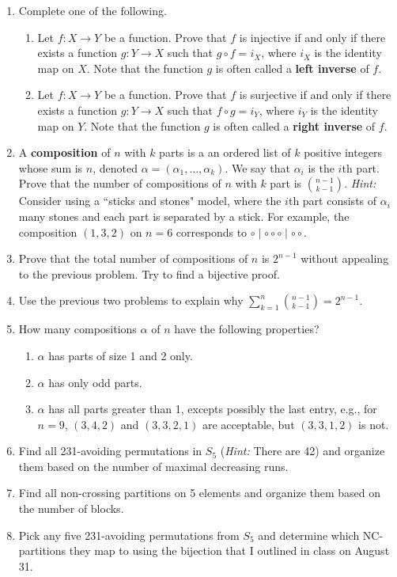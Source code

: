 \documentclass[11pt]{article}%
\theoremstyle{definition}
\begin{document}
\begin{enumerate}

\item Complete one of the following.
\begin{enumerate}
\item Let $f:X\to Y$ be a function.  Prove that $f$ is injective if and only if there exists a function $g:Y\to X$ such that $g\circ f=i_X$, where $i_X$ is the identity map on $X$. Note that the function $g$ is often called a \textbf{left inverse} of $f$.
\item Let $f:X\to Y$ be a function.  Prove that $f$ is surjective if and only if there exists a function $g:Y\to X$ such that $f\circ g=i_Y$, where $i_Y$ is the identity map on $Y$. Note that the function $g$ is often called a \textbf{right inverse} of $f$.
\end{enumerate}
\item A \textbf{composition} of $n$ with $k$ parts is a an ordered list of $k$ positive integers whose sum is $n$, denoted $\alpha=(\alpha_1,\ldots,\alpha_k)$.  We say that $\alpha_i$ is the $i$th part.  Prove that the number of compositions of $n$ with $k$ part is $\binom{n-1}{k-1}$.  \emph{Hint:} Consider using a ``sticks and stones" model, where the $i$th part consists of $\alpha_i$ many stones and each part is separated by a stick. For example, the composition $(1,3,2)$ on $n=6$ corresponds to $\circ \mid \circ \circ \circ \mid \circ \circ$.
\item Prove that the total number of compositions of $n$ is $2^{n-1}$ without appealing to the previous problem. Try to find a bijective proof.
\item Use the previous two problems to explain why $\sum_{k=1}^n\binom{n-1}{k-1}=2^{n-1}$.
\item\label{nugget} How many compositions $\alpha$ of $n$ have the following properties?
\begin{enumerate}
\item $\alpha$ has parts of size 1 and 2 only.
\item $\alpha$ has only odd parts.
\item $\alpha$ has all parts greater than 1, excepts possibly the last entry, e.g., for $n=9$, $(3,4,2)$ and $(3,3,2,1)$ are acceptable, but $(3,3,1,2)$ is not.
\end{enumerate}
\item Find all 231-avoiding permutations in $S_5$ (\emph{Hint:} There are 42) and organize them based on the number of maximal decreasing runs.
\item Find all non-crossing partitions on 5 elements and organize them based on the number of blocks.
\item Pick any five 231-avoiding permutations from $S_5$ and determine which NC-partitions they map to using the bijection that I outlined in class on August 31.
\end{enumerate}
\end{document}
